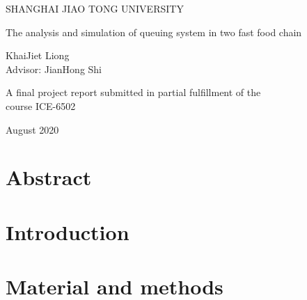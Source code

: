 \documentclass[a4paper,11]{article}
\begin{document}
\begin{center}
	{\large SHANGHAI JIAO TONG UNIVERSITY}
\end{center}
\vspace{6cm}

\begin{center}

	\Huge The analysis and simulation of queuing system in two fast food chain\\
	\vspace{.5cm}
	

\end{center}
\vspace{2.5cm}
\begin{center}
	\Large KhaiJiet Liong \\Advisor: JianHong Shi
\end{center}

\vspace{8cm}
\begin{center}
	{\large A final project report submitted in partial fulfillment of the \\course ICE-6502 }
\end{center}

\begin{center}
	{\large August 2020}
\end{center}

\newpage
{}


\tableofcontents
\pagebreak
\newpage

\cleardoublepage{}


\section*{Abstract}

\pagebreak

\section{Introduction}

\pagebreak

\section{Material and methods}

\pagebreak
\end{document}
